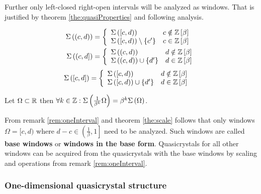 \documentclass[text.tex]{subfiles}
\begin{document}
\begin{remark}
\label{rem:oneInterval}
Further only left-closed right-open intervals will be analyzed as windows. That is justified by theorem \ref{the:quasiProperties} and following analysis.
%
\begin{multicols}{2}
\noindent\begin{align*}
\Sigma\left((c,d)\right) &= \left\{ 
	\begin{array}{l l}
	\Sigma\left([c,d)\right) & c \notin \mathbb{Z}\left[\beta\right]\\
	\Sigma\left([c,d)\right)\setminus\{c'\} & c \in \mathbb{Z}\left[\beta\right]
	\end{array} \right.\\
\Sigma\left((c,d]\right) &= \left\{ 
	\begin{array}{l l}
	\Sigma\left((c,d)\right) & d \notin \mathbb{Z}\left[\beta\right]\\
	\Sigma\left((c,d)\right)\cup\{d'\} & d \in \mathbb{Z}\left[\beta\right]
	\end{array} \right.\\
\end{align*}
\begin{align*}
\Sigma\left([c,d]\right) &= \left\{ 
	\begin{array}{l l}
	\Sigma\left([c,d)\right) & d \notin \mathbb{Z}\left[\beta\right]\\
	\Sigma\left([c,d)\right)\cup\{d'\} & d \in \mathbb{Z}\left[\beta\right]
	\end{array} \right.
\end{align*}
\end{multicols}
%
\end{remark}

\begin{theorem}
\label{the:scale}
Let $\Omega \subset \mathbb{R}$ then $\forall k\in \mathbb{Z}: \Sigma\left(\frac{1}{\beta^k}\Omega\right) = \beta^k\Sigma\left(\Omega\right)$.
\end{theorem}

\begin{corollary}
\label{cor:baseInterval}
From remark \ref{rem:oneInterval} and theorem \ref{the:scale} follows that only windows $\Omega = [c,d)$ where $d-c\in\left( \frac{1}{\beta}, 1 \right]$ need to be analyzed. Such windows are called \textbf{base windows} or \textbf{windows in the base form}. Quasicrystals for all other windows can be acquired from the quasicrystals with the base windows by scaling and operations from remark \ref{rem:oneInterval}.
\end{corollary}

\subsubsection{One-dimensional quasicrystal structure}%
\end{document}
